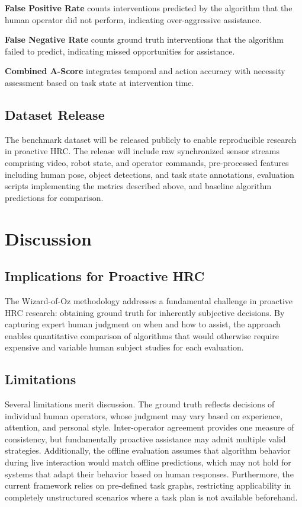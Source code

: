 \textbf{False Positive Rate} counts interventions predicted by the algorithm that the human operator did not perform, indicating over-aggressive assistance.

\textbf{False Negative Rate} counts ground truth interventions that the algorithm failed to predict, indicating missed opportunities for assistance.

\textbf{Combined A-Score} integrates temporal and action accuracy with necessity assessment based on task state at intervention time.

\subsection{Dataset Release}

The benchmark dataset will be released publicly to enable reproducible research in proactive HRC. The release will include raw synchronized sensor streams comprising video, robot state, and operator commands, pre-processed features including human pose, object detections, and task state annotations, evaluation scripts implementing the metrics described above, and baseline algorithm predictions for comparison.

\section{Discussion}
\label{sec:proactive_discussion}

\subsection{Implications for Proactive HRC}

The Wizard-of-Oz methodology addresses a fundamental challenge in proactive HRC research: obtaining ground truth for inherently subjective decisions. By capturing expert human judgment on when and how to assist, the approach enables quantitative comparison of algorithms that would otherwise require expensive and variable human subject studies for each evaluation.

\subsection{Limitations}

Several limitations merit discussion. The ground truth reflects decisions of individual human operators, whose judgment may vary based on experience, attention, and personal style. Inter-operator agreement provides one measure of consistency, but fundamentally proactive assistance may admit multiple valid strategies. Additionally, the offline evaluation assumes that algorithm behavior during live interaction would match offline predictions, which may not hold for systems that adapt their behavior based on human responses. Furthermore, the current framework relies on pre-defined task graphs, restricting applicability in completely unstructured scenarios where a task plan is not available beforehand.

